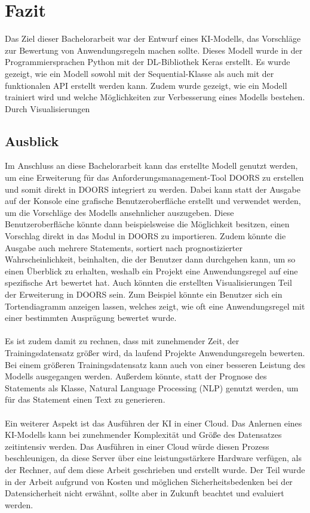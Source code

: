 \chapter{Fazit}
\label{chap:Fazit}
Das Ziel dieser Bachelorarbeit war der Entwurf eines \ac{KI}-Modells, das Vorschläge zur Bewertung von Anwendungsregeln machen sollte. Dieses Modell wurde
in der Programmiersprachen Python mit der \ac{DL}-Bibliothek Keras erstellt. Es wurde gezeigt, wie ein Modell sowohl mit der \glqq Sequential\grqq{}-Klasse
als auch mit der funktionalen \ac{API} erstellt werden kann. Zudem wurde gezeigt, wie ein Modell trainiert wird und welche Möglichkeiten zur Verbesserung eines 
Modells bestehen. Durch Visualisierungen 
\section{Ausblick}
\label{chap:Ausblick}
Im Anschluss an diese Bachelorarbeit kann das erstellte Modell genutzt werden, um eine Erweiterung für das Anforderungsmanagement-Tool \ac{DOORS} zu erstellen
und somit direkt in \ac{DOORS} integriert zu werden.
Dabei kann statt der Ausgabe auf der Konsole eine grafische Benutzeroberfläche erstellt und verwendet werden, um die Vorschläge des Modells ansehnlicher auszugeben.
Diese Benutzeroberfläche könnte dann beispielsweise die Möglichkeit besitzen, einen Vorschlag direkt in das Modul in \ac{DOORS} zu importieren. 
Zudem könnte die Ausgabe auch mehrere Statements, sortiert nach prognostizierter Wahrscheinlichkeit, beinhalten, die der Benutzer dann durchgehen kann, um so einen Überblick 
zu erhalten, weshalb ein Projekt eine Anwendungsregel auf eine spezifische Art bewertet hat. Auch könnten die erstellten Visualisierungen Teil der Erweiterung in \ac{DOORS} sein.
Zum Beispiel könnte ein Benutzer sich ein Tortendiagramm anzeigen lassen, welches zeigt, wie oft eine Anwendungsregel mit einer bestimmten Ausprägung bewertet wurde.
\\ \\
Es ist zudem damit zu rechnen, dass mit zunehmender Zeit, der Trainingsdatensatz größer wird, da laufend Projekte Anwendungsregeln bewerten. Bei einem größeren Trainingsdatensatz 
kann auch von einer besseren Leistung des Modells ausgegangen werden. Außerdem könnte, statt der Prognose des Statements als Klasse, Natural Language Processing (NLP) genutzt werden, 
um für das Statement einen Text zu generieren. 
\\ \\
Ein weiterer Aspekt ist das Ausführen der \ac{KI} in einer Cloud. Das Anlernen eines \ac{KI}-Modells
kann bei zunehmender Komplexität und Größe des Datensatzes zeitintensiv werden. Das Ausführen in einer Cloud würde diesen Prozess beschleunigen,
da diese Server über eine leistungsstärkere Hardware verfügen, als der Rechner, auf dem diese Arbeit geschrieben und erstellt wurde. Der Teil wurde in der Arbeit aufgrund von 
Kosten und möglichen Sicherheitsbedenken bei der Datensicherheit nicht erwähnt, sollte aber in Zukunft beachtet und evaluiert werden. 